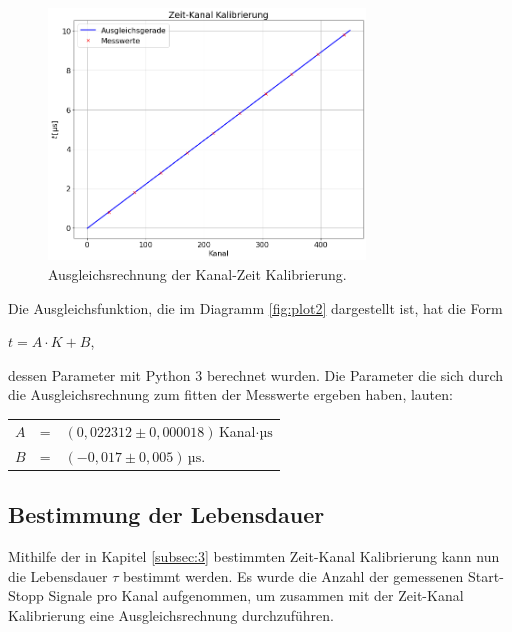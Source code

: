 \begin{figure}[H]
 \centering
 \includegraphics[width=0.75\textwidth]{plot2.png}
 \caption{Ausgleichsrechnung der Kanal-Zeit Kalibrierung.}
 \label{fig:plot2}
\end{figure}

\noindent Die Ausgleichsfunktion, die im Diagramm \eqref{fig:plot2} dargestellt ist, hat die Form

\begin{center}
$t = A \cdot K+B$,
\end{center}

\noindent dessen Parameter mit Python 3 berechnet wurden. Die Parameter die sich durch die Ausgleichsrechnung zum fitten der Messwerte ergeben haben, lauten:

\begin{table}[H]
\centering
\begin{tabular}{lll}
$A$   &=& $(0,022312 \pm 0,000018)\,$Kanal$\cdot\mathrm{µs}$    \\
$B$   &=& $(-0,017 \pm 0,005)\,\mathrm{µs} .$ \\
\end{tabular}
\end{table}

\subsection{Bestimmung der Lebensdauer}
\label{subsec:4}

\noindent Mithilfe der in Kapitel \ref{subsec:3} bestimmten Zeit-Kanal Kalibrierung kann nun die Lebensdauer $\tau$ bestimmt werden. Es wurde die Anzahl der gemessenen Start-Stopp Signale pro Kanal aufgenommen, um zusammen mit der Zeit-Kanal Kalibrierung eine Ausgleichsrechnung durchzuführen. 

